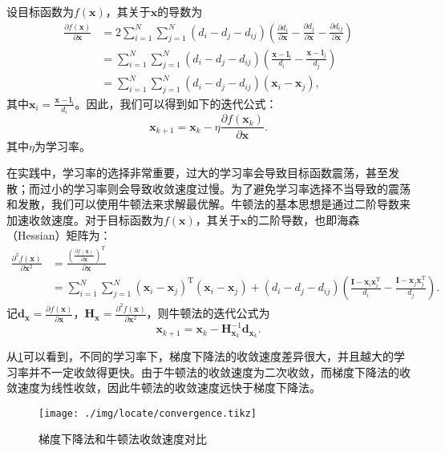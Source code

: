 设目标函数为\( f(\bm{x}) \)，其关于\( \bm{x} \)的导数为
\[
    \begin{split}
        \frac{\partial f(\bm{x})}{\partial \bm{x}} & =2 \sum_{i=1}^{N} \sum_{j=1}^{N} (d_i - d_j - d_{ij}) \left( \frac{\partial d_i}{\partial \bm{x}} - \frac{\partial d_j}{\partial \bm{x}} - \frac{\partial d_{ij}}{\partial \bm{x}} \right) \\
                                                   & = \sum_{i=1}^{N} \sum_{j=1}^{N} (d_i - d_j - d_{ij}) \left( \frac{\bm{x} - \bm{l}_i}{d_i} - \frac{\bm{x} - \bm{l}_j}{d_j} \right)                                                          \\
                                                   & = \sum_{i=1}^{N} \sum_{j=1}^{N} (d_i - d_j - d_{ij}) \left( \bm{x}_i - \bm{x}_j \right),
    \end{split}
\]
其中\( \bm{x}_i =  \frac{\bm{x} - \bm{l}_i}{d_i}\)。因此，我们可以得到如下的迭代公式：
\[
    \bm{x}_{k+1} = \bm{x}_k - \eta \frac{\partial f(\bm{x}_k)}{\partial \bm{x}}.
\]
其中\( \eta \)为学习率。

在实践中，学习率的选择非常重要，过大的学习率会导致目标函数震荡，甚至发散；而过小的学习率则会导致收敛速度过慢。为了避免学习率选择不当导致的震荡和发散，我们可以使用牛顿法来求解最优解。牛顿法的基本思想是通过二阶导数来加速收敛速度。对于目标函数为\( f(\bm{x}) \)，其关于\( \bm{x} \)的二阶导数，也即海森（Hessian）矩阵为：
\[
    \begin{split}
        \frac{\partial^2 f(\bm{x})}{\partial \bm{x}^2} & = \frac{\left( \frac{\partial f(\bm{x})}{\partial\bm{x}} \right)^{\mathrm{T}}}{\partial \bm{x}}                                                                                                                                                                         \\
                                                       & = \sum_{i=1}^{N} \sum_{j=1}^{N} \left(\bm{x}_i - \bm{x}_j\right)^{\mathrm{T}} \left(\bm{x}_i - \bm{x}_j\right) + (d_i - d_j - d_{ij}) \left( \frac{\mathbf{I} - \bm{x}_i \bm{x}_i^{\mathrm{T}}}{d_i}  - \frac{\mathbf{I} - \bm{x}_j \bm{x}_j^{\mathrm{T}}}{d_j}\right).
    \end{split}
\]
记\( \bm{d}_{\bm{x}} =  \frac{\partial f(\bm{x})}{\partial \bm{x}}\)，\( \mathbf{H}_{\bm{x}} =  \frac{\partial^2 f(\bm{x})}{\partial \bm{x}^2}\)，则牛顿法的迭代公式为
\[
    \bm{x}_{k+1} = \bm{x}_k - \mathbf{H}_{\bm{x}_k}^{-1} \bm{d}_{\bm{x}_k}.
\]

从\cref{fig_convergence}可以看到，不同的学习率下，梯度下降法的收敛速度差异很大，并且越大的学习率并不一定收敛得更快。由于牛顿法的收敛速度为二次收敛，而梯度下降法的收敛速度为线性收敛，因此牛顿法的收敛速度远快于梯度下降法。
\begin{figure}[htb!]
    \centering
    \texttt{[image: ./img/locate/convergence.tikz]}
    \caption{梯度下降法和牛顿法收敛速度对比}
    \label{fig_convergence}
\end{figure}

